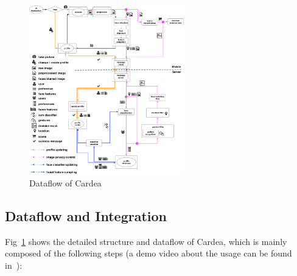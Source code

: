 \begin{figure}[b!]
    \centering
    \includegraphics[width=0.6\textwidth]{figure/ch4-cardeadataflow.pdf}
    \caption{Dataflow of Cardea}
    \label{fig:ch4-cardeadataflow}
\end{figure}

\subsection{Dataflow and Integration}
Fig~\ref{fig:ch4-cardeadataflow} shows the detailed structure and dataflow of Cardea, which is mainly composed of the following steps (a demo video about the usage can be found in~\cite{links:cardeavid}):

